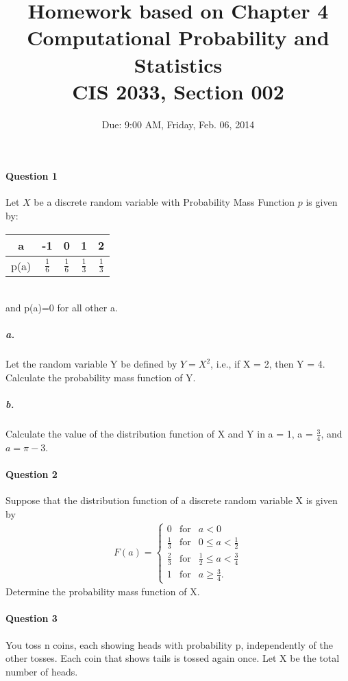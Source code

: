 \documentclass[11pt]{article} %
\title{Homework based on Chapter 4\\
Computational Probability and Statistics \\
CIS 2033, Section 002}
\author{Due: 9:00 AM, Friday, Feb. 06, 2014}
\date{} %
\begin{document}
\maketitle

\paragraph*{\bf Question 1}
Let $X$ be a discrete random variable with Probability Mass Function $p$ is given by: \\
\begin{table}[h!]
\begin{center}
\begin{tabular}{c|cccc} \hline
a & -1 & 0 & 1 & 2 \\ \hline
p(a) & $\frac{1}{6}$ & $\frac{1}{6}$ & $\frac{1}{3}$ & $\frac{1}{3}$ \\ \hline
\end{tabular}
\label{ta1}
\end{center}
\end{table}
\\ and p(a)=0 for all other a. 

\subparagraph*{a.} Let the random variable Y be defined by $Y=X^2$, i.e., if X = 2, then Y = 4. Calculate the probability mass function of Y. 
\subparagraph*{b.} Calculate the value of the distribution function of X and Y in a = 1, a = $\frac{3}{4}$, and $a=\pi - 3$. 


\paragraph*{\bf Question 2}
Suppose that the distribution function of a discrete random variable X is given by 
\begin{align*}
F(a) = \left\{ 
\begin{array}{rcl}
0 & \mbox{for} & a < 0\\
\frac{1}{3} & \mbox{for} & 0 \leq a < \frac{1}{2} \\
\frac{2}{3} & \mbox{for} & \frac{1}{2} \leq a < \frac{3}{4} \\
1 & \mbox{for} & a \geq \frac{3}{4}.
\end{array} \right.
\end{align*}
Determine the probability mass function of X. 

\vspace{8em}
\paragraph*{\bf Question 3}
You toss n coins, each showing heads with probability p, independently of the other tosses. Each coin that shows tails is tossed again once. Let X be the total number of heads. 
\end{document}
